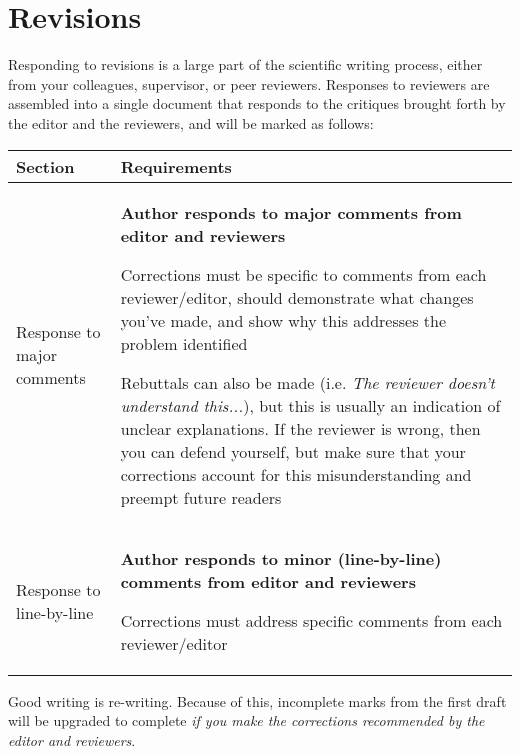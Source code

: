 \documentclass[11pt]{article}
\newcommand{\tabit}{\scriptsize\par\textbullet\phantom{ }}
\begin{document}
\section*{Revisions}

Responding to revisions is a large part of the scientific writing process, either from your colleagues, supervisor, or peer reviewers. Responses to reviewers are assembled into a single document that responds to the critiques brought forth by the editor and the reviewers, and will be marked as follows:

\begin{table}[h!]
\centering
\begin{tabular}{p{3cm}|p{12cm}}
\textbf{Section} & \textbf{Requirements} \\ \hline

Response to major comments & \textbf{Author responds to major comments from editor and reviewers} \tabit Corrections must be specific to comments from each reviewer/editor, should demonstrate what changes you've made, and show why this addresses the problem identified \tabit Rebuttals can also be made (i.e. \emph{The reviewer doesn't understand this...}), but this is usually an indication of unclear explanations. If the reviewer is wrong, then you can defend yourself, but make sure that your corrections account for this misunderstanding and preempt future readers \\ \hline
Response to line-by-line & \textbf{Author responds to minor (line-by-line) comments from editor and reviewers} \tabit Corrections must address specific comments from each reviewer/editor \\

\end{tabular}
\end{table}

Good writing is re-writing. Because of this, incomplete marks from the first draft will be upgraded to complete \emph{if you make the corrections recommended by the editor and reviewers}. 
\end{document}

